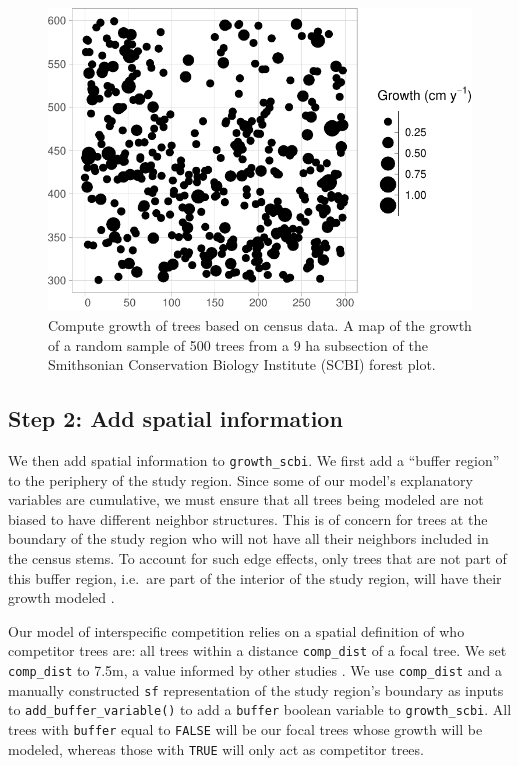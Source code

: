 \documentclass[12pt]{article}
\begin{document}
\begin{figure}

{\centering \includegraphics[width=0.66\linewidth]{Figures/scbi-trees-1} 

}

\caption{Compute growth of trees based on census data. A map of the growth of a random sample of 500 trees from a 9 ha subsection of the Smithsonian Conservation Biology Institute (SCBI) forest plot.}\label{fig:scbi-trees}
\end{figure}

\hypertarget{spatial-information}{%
\subsection{Step 2: Add spatial information}\label{spatial-information}}

We then add spatial information to \texttt{growth\_scbi}. We first add a
``buffer region'' to the periphery of the study region. Since some of
our model's explanatory variables are cumulative, we must ensure that
all trees being modeled are not biased to have different neighbor
structures. This is of concern for trees at the boundary of the study
region who will not have all their neighbors included in the census
stems. To account for such edge effects, only trees that are not part of
this buffer region, i.e.~are part of the interior of the study region,
will have their growth modeled \citep{waller_applied_2004}.

Our model of interspecific competition relies on a spatial definition of
who competitor trees are: all trees within a distance
\texttt{comp\_dist} of a focal tree. We set \texttt{comp\_dist} to 7.5m,
a value informed by other studies \citep[\citet{uriarte_spatially_2004},
\citet{canham_neighborhood_2006}]{canham_neighborhood_2004}. We use
\texttt{comp\_dist} and a manually constructed \texttt{sf}
representation of the study region's boundary as inputs to
\texttt{add\_buffer\_variable()} to add a \texttt{buffer} boolean
variable to \texttt{growth\_scbi}. All trees with \texttt{buffer} equal
to \texttt{FALSE} will be our focal trees whose growth will be modeled,
whereas those with \texttt{TRUE} will only act as competitor trees.
\end{document}
